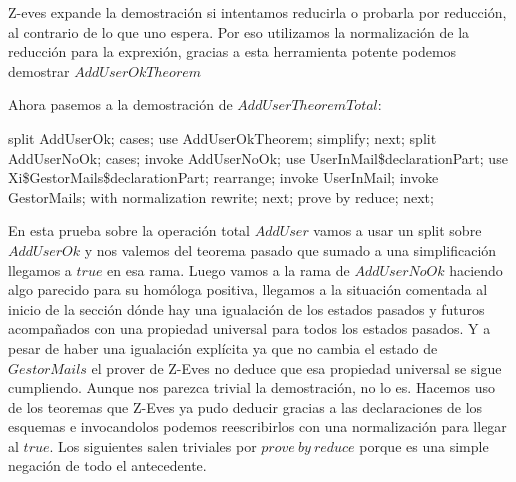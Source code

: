 Z-eves expande la demostración si intentamos reducirla o probarla por reducción, al contrario de lo que uno espera. Por eso utilizamos la normalización de la reducción para la exprexión, gracias a esta herramienta potente podemos demostrar $AddUserOkTheorem$

Ahora pasemos a la demostración de $AddUserTheoremTotal$:

\begin{zproof}[AddUserTheoremTotal]
split AddUserOk;
cases;
use AddUserOkTheorem;
simplify;
next;
split AddUserNoOk;
cases;
invoke AddUserNoOk;
use UserInMail\$declarationPart;
use Xi\$GestorMails\$declarationPart;
rearrange;
invoke UserInMail;
invoke \Xi GestorMails;
with normalization rewrite;
next;
prove by reduce;
next;
\end{zproof}

En esta prueba sobre la operación total $AddUser$ vamos a usar un split sobre $AddUserOk$ y nos valemos del teorema pasado que sumado a una simplificación llegamos a $true$ en esa rama. Luego vamos a la rama de $AddUserNoOk$ haciendo algo parecido para su homóloga positiva, llegamos a la situación comentada al inicio de la sección dónde hay una igualación de los estados pasados y futuros acompañados con una propiedad universal para todos los estados pasados. Y a pesar de haber una igualación explícita ya que no cambia el estado de $GestorMails$ el prover de Z-Eves no deduce que esa propiedad universal se sigue cumpliendo. Aunque nos parezca trivial la demostración, no lo es. Hacemos uso de los teoremas que Z-Eves ya pudo deducir gracias a las declaraciones de los esquemas e invocandolos podemos reescribirlos con una normalización para llegar al $true$. Los siguientes salen triviales por $prove\ by\ reduce$ porque es una simple negación de todo el antecedente.